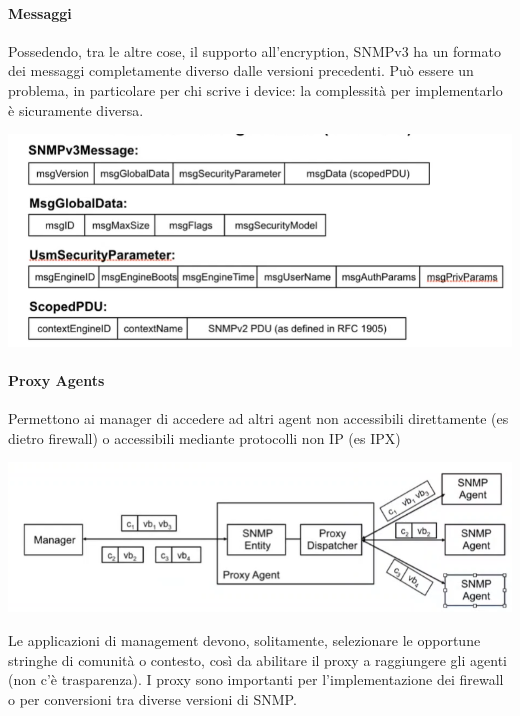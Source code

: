 \documentclass[10pt]{book}
\begin{document}
\paragraph{Messaggi} Possedendo, tra le altre cose, il supporto all'encryption, SNMPv3 ha un formato dei messaggi completamente diverso dalle versioni precedenti. Può essere un problema, in particolare per chi scrive i device: la complessità per implementarlo è sicuramente diversa.
\begin{center}
	\includegraphics[scale=0.75]{snmp3msg.png}
\end{center}
\paragraph{Proxy Agents} Permettono ai manager di accedere ad altri agent non accessibili direttamente (es dietro firewall) o accessibili mediante protocolli non IP (es IPX)
\begin{center}
	\includegraphics[scale=0.75]{snmp3proxyagents.png}
\end{center}
Le applicazioni di management devono, solitamente, selezionare le opportune stringhe di comunità o contesto, così da abilitare il proxy a raggiungere gli agenti (non c'è trasparenza). I proxy sono importanti per l'implementazione dei firewall o per conversioni tra diverse versioni di SNMP.
\end{document}
